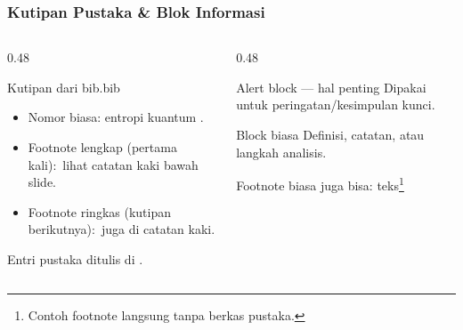 \begin{frame}
    \frametitle{Kutipan Pustaka \& Blok Informasi}
    \begin{columns}[T]
        \begin{column}{0.48\textwidth}
            \begin{exampleblock}{Kutipan dari bib.bib}
                {\small
                \begin{itemize}\justifying
                    \item Nomor biasa: entropi kuantum
                          \cite{barnett2009quantum}.
                    \item Footnote lengkap (pertama kali):\
                          lihat catatan kaki bawah slide.
                    \item Footnote ringkas (kutipan berikutnya):\
                          juga di catatan kaki.
                \end{itemize}}
            \end{exampleblock}
            {\tiny Entri pustaka ditulis di .}
        \end{column}
        \begin{column}{0.48\textwidth}
            \begin{alertblock}{Alert block --- hal penting}
                {\small Dipakai untuk peringatan/kesimpulan kunci.}
            \end{alertblock}
            \begin{block}{Block biasa}
                {\small Definisi, catatan, atau langkah analisis.}
            \end{block}
            {\tiny Footnote biasa juga bisa: teks\footnote{Contoh
                   footnote langsung tanpa berkas pustaka.}}
        \end{column}
    \end{columns}
\end{frame}

